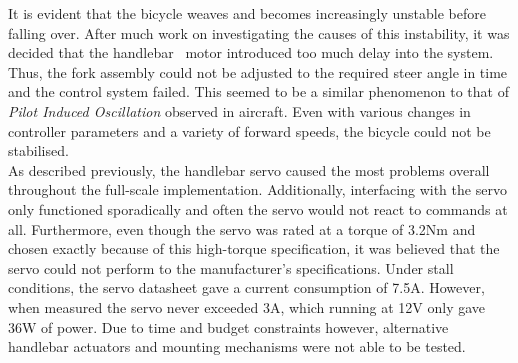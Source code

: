 It is evident that the bicycle weaves and becomes increasingly unstable before falling over. After much work on investigating the causes of this instability, it was decided that the handlebar~ motor introduced too much delay into the system. Thus, the fork assembly could not be adjusted to the required steer angle in time and the control system failed. This seemed to be a similar phenomenon to that of \textit{Pilot Induced Oscillation} observed in aircraft. Even with various changes in controller parameters and a variety of forward speeds, the bicycle could not be stabilised. \\

As described previously, the handlebar servo caused the most problems overall throughout the full-scale implementation. Additionally, interfacing with the servo only functioned sporadically and often the servo would not react to commands at all. Furthermore, even though the servo was rated at a torque of 3.2Nm and chosen exactly because of this high-torque specification, it was believed that the servo could not perform to the manufacturer's specifications. Under stall conditions, the servo datasheet gave a current consumption of 7.5A. However, when measured the servo never exceeded 3A, which running at 12V only gave 36W of power. Due to time and budget constraints however, alternative handlebar actuators and mounting mechanisms were not able to be tested. 

\newpage